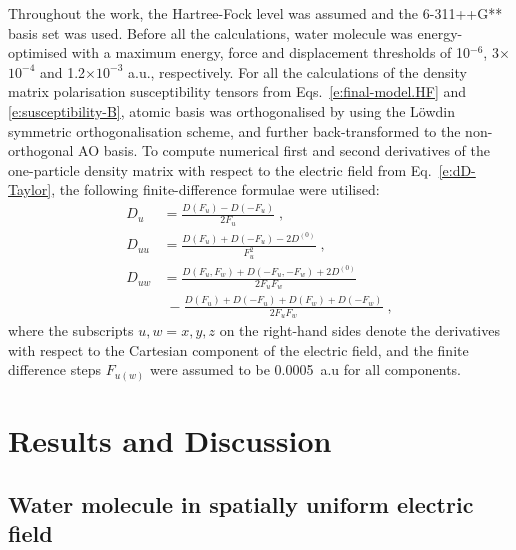 \documentclass[aip,amsmath,amssymb,reprint,floatfix]{revtex4-1}
\begin{document}
%
Throughout the work, the Hartree\hyp{}Fock level\cite{Roothaan.RevModPhys.1951} was assumed 
and the 6-311++G** basis set\cite{Krishnan.Binkley.Seeger.Pople.JCP.1980}
was used. Before all the calculations, water molecule was energy\hyp{}optimised
with a maximum energy, force and displacement thresholds of 10$^{-6}$, 3$\times$$10^{-4}$ 
and 1.2$\times$$10^{-3}$ a.u., respectively.
For all the calculations of the density matrix polarisation susceptibility tensors
from Eqs.~\eqref{e:final-model.HF} and \eqref{e:susceptibility-B}, 
atomic basis was orthogonalised by using the L{\"o}wdin symmetric orthogonalisation scheme,\cite{Mayer.IJQC.2002}
and further back\hyp{}transformed to the non\hyp{}orthogonal AO basis.
To compute numerical first and second derivatives of the one\hyp{}particle density matrix
with respect to the electric field from Eq.~\eqref{e:dD-Taylor}, 
the following finite\hyp{}difference formulae were utilised:
%
\begin{subequations}\label{e:ff}
  \begin{align}
    D_u    &= \frac{D(F_u) - D(-F_u)}{2F_u} \;,\\
    D_{uu} &= \frac{D(F_u) + D(-F_u) - 2D^{(0)}}{F_u^2} \;,\\
    D_{uw} &= \frac{D(F_u,F_w) + D(-F_u,-F_w) + 2D^{(0)}}{2F_uF_w} \nonumber \\ 
           & \; -\frac{D(F_u) + D(-F_u) + D(F_w) + D(-F_w)}{2F_uF_w} \;,
  \end{align}
\end{subequations}
%
where 
the subscripts $u,w=x,y,z$ on the right\hyp{}hand sides denote the derivatives with respect 
to the Cartesian component of the electric field, and the finite difference
steps $F_{u(w)}$ were assumed to be 0.0005~a.u for all components. 

\section{\label{s:4}Results and Discussion}

\subsection{\label{ss:41}Water molecule in spatially uniform electric field}
\end{document}
